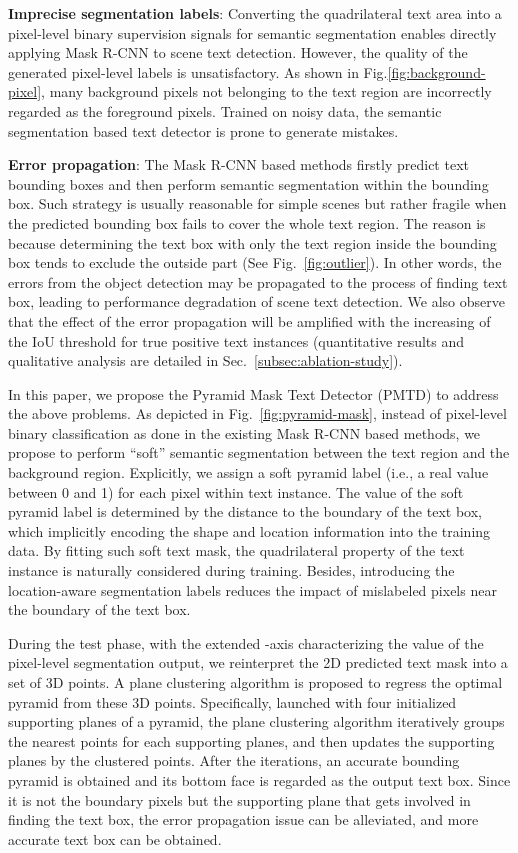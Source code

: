 \documentclass[10pt,twocolumn,letterpaper]{article}
\begin{document}
\textbf{Imprecise segmentation labels}: Converting the quadrilateral text area into a pixel-level binary supervision signals for semantic segmentation enables directly applying Mask R-CNN to scene text detection. However, the quality of the generated pixel-level labels is unsatisfactory. As shown in Fig.\ref{fig:background-pixel}, many background pixels not belonging to the text region are incorrectly regarded as the foreground pixels. Trained on noisy data, the semantic segmentation based text detector is prone to generate mistakes.

\textbf{Error propagation}: The Mask R-CNN based methods firstly predict text bounding boxes and then perform semantic segmentation within the bounding box. Such strategy is usually reasonable for simple scenes but rather fragile when the predicted bounding box fails to cover the whole text region. The reason is because determining the text box with only the text region inside the bounding box tends to exclude the outside part (See Fig.~\ref{fig:outlier}). In other words, the errors from the object detection may be propagated to the process of finding text box, leading to performance degradation of scene text detection. We also observe that the effect of the error propagation will be amplified with the increasing of the IoU threshold for true positive text instances (quantitative results and qualitative analysis are detailed in Sec.~\ref{subsec:ablation-study}).






In this paper, we propose the Pyramid Mask Text Detector (PMTD) to address the above problems. As depicted in Fig.~\ref{fig:pyramid-mask}, instead of pixel-level binary classification as done in the existing Mask R-CNN based methods, we propose to perform ``soft'' semantic segmentation between the text region and the background region. Explicitly, we assign a soft pyramid label (i.e., a real value between 0 and 1) for each pixel within text instance. The value of the soft pyramid label is determined by the distance to the boundary of the text box, which implicitly encoding the shape and location information into the training data. By fitting such soft text mask, the quadrilateral property of the text instance is naturally considered during training. Besides, introducing the location-aware segmentation labels reduces the impact of mislabeled pixels near the boundary of the text box.

During the test phase, with the extended -axis characterizing the value of the pixel-level segmentation output, we reinterpret the 2D predicted text mask into a set of 3D points. A plane clustering algorithm is proposed to regress the optimal pyramid from these 3D points. Specifically, launched with four initialized supporting planes of a pyramid, the plane clustering algorithm iteratively groups the nearest points for each supporting planes, and then updates the supporting planes by the clustered points. After the iterations, an accurate bounding pyramid is obtained and its bottom face is regarded as the output text box. Since it is not the boundary pixels but the supporting plane that gets involved in finding the text box, the error propagation issue can be alleviated, and more accurate text box can be obtained.
\end{document}
